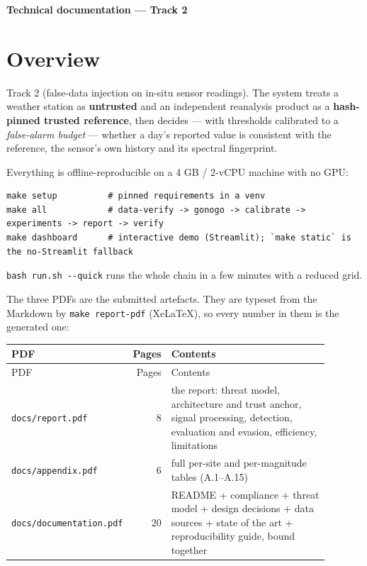 \documentclass[10pt,a4paper]{article}
\begin{document}
\begin{center}
{\Large\bfseries Technical documentation — Track 2\par}
\vspace{3pt}

\end{center}
\vspace{-2pt}
\clearpage
\section*{Overview}
Track 2 (false-\allowbreak{}data injection on in-\allowbreak{}situ sensor readings). The system treats a weather station as \textbf{untrusted} and an independent reanalysis product as a \textbf{hash-\allowbreak{}pinned trusted reference}, then decides — with thresholds calibrated to a \emph{false-\allowbreak{}alarm budget} — whether a day's reported value is consistent with the reference, the sensor's own history and its spectral fingerprint.

Everything is offline-\allowbreak{}reproducible on a 4 GB /\allowbreak{} 2-\allowbreak{}vCPU machine with no GPU:

\begin{Verbatim}[breaklines=true,breakanywhere=true,fontsize=\footnotesize,frame=none,numbers=none]
make setup          # pinned requirements in a venv
make all            # data-verify -> gonogo -> calibrate -> experiments -> report -> verify
make dashboard      # interactive demo (Streamlit); `make static` is the no-Streamlit fallback
\end{Verbatim}

\texttt{bash run.sh -\allowbreak{}-\allowbreak{}quick} runs the whole chain in a few minutes with a reduced grid.

The three PDFs are the submitted artefacts. They are typeset from the Markdown by \texttt{make report-\allowbreak{}pdf} (XeLaTeX), so every number in them is the generated one:

{\small
\setlength{\tabcolsep}{4.5pt}
\setlength{\LTleft}{\fill}
\setlength{\LTright}{\fill}
\begin{longtable}{>{\raggedright\arraybackslash}p{0.219\linewidth}r>{\raggedright\arraybackslash}p{0.667\linewidth}}
\toprule
PDF & Pages & Contents \\
\midrule
\endfirsthead
\toprule
PDF & Pages & Contents \\
\midrule
\endhead
\bottomrule
\endlastfoot
\texttt{docs/\allowbreak{}report.pdf} & 8 & the report: threat model, architecture and trust anchor, signal processing, detection, evaluation and evasion, efficiency, limitations \\
\texttt{docs/\allowbreak{}appendix.pdf} & 6 & full per-\allowbreak{}site and per-\allowbreak{}magnitude tables (A.1–A.15) \\
\texttt{docs/\allowbreak{}documentation.pdf} & 20 & README + compliance + threat model + design decisions + data sources + state of the art + reproducibility guide, bound together \\
\end{longtable}
}
\end{document}
